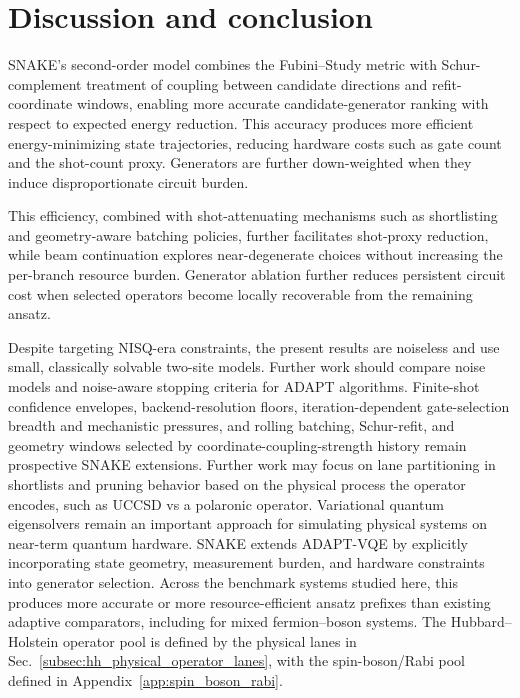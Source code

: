\documentclass[
  reprint,
  amsmath,
  amssymb,
  aps,
  pra,
  nofootinbib,
  superscriptaddress,
  floatfix
]{revtex4-2}
\begin{document}
\par\addvspace{1.0ex}

\section{Discussion and conclusion}
\label{sec:discussion}
\label{sec:conclusion}

SNAKE's second-order model combines the Fubini--Study metric with Schur-complement treatment of coupling between candidate directions and refit-coordinate windows, enabling more accurate candidate-generator ranking with respect to expected energy reduction. This accuracy produces more efficient energy-minimizing state trajectories, reducing hardware costs such as gate count and the shot-count proxy. Generators are further down-weighted when they induce disproportionate circuit burden.

This efficiency, combined with shot-attenuating mechanisms such as shortlisting and geometry-aware batching policies, further facilitates shot-proxy reduction, while beam continuation explores near-degenerate choices without increasing the per-branch resource burden. Generator ablation further reduces persistent circuit cost when selected operators become locally recoverable from the remaining ansatz.

Despite targeting NISQ-era constraints, the present results are noiseless and use small, classically solvable two-site models. Further work should compare noise models and noise-aware stopping criteria for ADAPT algorithms. Finite-shot confidence envelopes, backend-resolution floors, iteration-dependent gate-selection breadth and mechanistic pressures, and rolling batching, Schur-refit, and geometry windows selected by coordinate-coupling-strength history remain prospective SNAKE extensions. Further work may focus on lane partitioning in shortlists and pruning behavior based on the physical process the operator encodes, such as UCCSD vs a polaronic operator.
Variational quantum eigensolvers remain an important approach for simulating physical systems on near-term quantum hardware. SNAKE extends ADAPT-VQE by explicitly incorporating state geometry, measurement burden, and hardware constraints into generator selection. Across the benchmark systems studied here, this produces more accurate or more resource-efficient ansatz prefixes than existing adaptive comparators, including for mixed fermion--boson systems. The Hubbard--Holstein operator pool is defined by the physical lanes in Sec.~\ref{subsec:hh_physical_operator_lanes}, with the spin-boson/Rabi pool defined in Appendix~\ref{app:spin_boson_rabi}.
\end{document}
